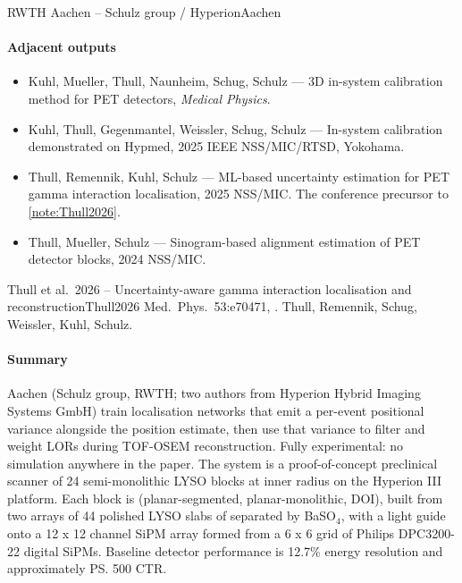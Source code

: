\begin{programnote}{RWTH Aachen -- Schulz group / Hyperion}{Aachen}
\paragraph{Adjacent outputs}
\begin{itemize}
	\item Kuhl, Mueller, Thull, Naunheim, Schug, Schulz --- 3D in-system
		calibration method for PET detectors, \emph{Medical Physics}.
	\item Kuhl, Thull, Gegenmantel, Weissler, Schug, Schulz --- In-system
		calibration demonstrated on Hypmed, 2025 IEEE NSS/MIC/RTSD, Yokohama.
	\item Thull, Remennik, Kuhl, Schulz --- ML-based uncertainty estimation for
		PET gamma interaction localisation, 2025 NSS/MIC. The conference
		precursor to \ref{note:Thull2026}.
	\item Thull, Mueller, Schulz --- Sinogram-based alignment estimation of PET
		detector blocks, 2024 NSS/MIC.
\end{itemize}
 
\begin{papernote}{Thull et al.\ 2026 -- Uncertainty-aware gamma interaction localisation and reconstruction}{Thull2026}
Med.\ Phys.\ 53:e70471, . Thull, Remennik, Schug, Weissler,
Kuhl, Schulz.

\paragraph{Summary}
Aachen (Schulz group, RWTH; two authors from Hyperion Hybrid Imaging Systems GmbH)
train localisation networks that emit a per-event positional variance alongside the
position estimate, then use that variance to filter and weight LORs during TOF-OSEM
reconstruction. Fully experimental: no simulation anywhere in the paper. The system is a
proof-of-concept preclinical scanner of 24 semi-monolithic LYSO blocks at  inner
radius on the Hyperion III platform. Each block is
 (planar-segmented,
planar-monolithic, DOI), built from two arrays of 44 polished LYSO slabs of
 separated by  BaSO$_4$, with a 
light guide onto a 12 x 12
channel SiPM array formed from a 6 x 6 grid of Philips DPC3200-22 digital SiPMs.
Baseline detector performance is 12.7\% energy resolution and approximately \ps{500} CTR.


\end{papernote}
\end{programnote}
